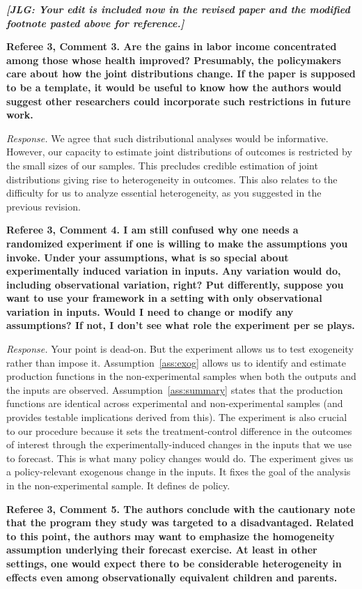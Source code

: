 \textit{\textbf{[JLG: Your edit is included now in the revised paper and the modified footnote pasted above for reference.]}}

\noindent \textbf{Referee 3, Comment 3. Are the gains in labor income concentrated among those whose health improved? Presumably, the policymakers care about how the joint distributions change. If the paper is supposed to be a template, it would be useful to know how the authors would suggest other researchers could incorporate such restrictions in future work.}

\noindent \textit{Response.} We agree that such distributional analyses would be informative. However, our capacity to estimate joint distributions of outcomes is restricted by the small sizes of our samples. This precludes credible estimation of joint distributions giving rise to heterogeneity in outcomes. This also relates to the difficulty for us to analyze essential heterogeneity, as you suggested in the previous revision.

\noindent \textbf{Referee 3, Comment 4. I am still confused why one needs a randomized experiment if one is willing to make the assumptions you invoke. Under your assumptions, what is so special about experimentally induced variation in inputs. Any variation would do, including observational variation, right? Put differently, suppose you want to use your framework in a setting with only observational variation in inputs. Would I need to change or modify any assumptions? If not, I don't see what role the experiment per se plays.}

\noindent \textit{Response.} Your point is dead-on. But the experiment allows us to test exogeneity rather than impose it. Assumption~\ref{ass:exog} allows us to identify and estimate production functions in the non-experimental samples when both the outputs and the inputs are observed. Assumption~\ref{ass:summary} states that the production functions are identical across experimental and non-experimental samples (and provides testable implications derived from this). The experiment is also crucial to our procedure because it sets the treatment-control difference in the outcomes of interest through the experimentally-induced changes in the inputs that we use to forecast. This is what many policy changes would do. The experiment gives us a policy-relevant exogenous change in the inputs. It fixes the goal of the analysis in the non-experimental sample. It defines de policy.

\noindent \textbf{Referee 3, Comment 5. The authors conclude with the cautionary note that the program they study was targeted to a disadvantaged. Related to this point, the authors may want to emphasize the homogeneity assumption underlying their forecast exercise. At least in other settings, one would expect there to be considerable heterogeneity in effects even among observationally equivalent children and parents.}

